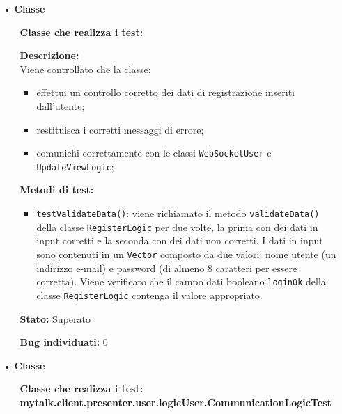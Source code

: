 {\begin{sloppypar}
{{			%
			\begin{itemize}
			\item[•]\textbf{Classe }
				\begin{itemize}
					\item[] \textbf{Classe che realizza i test:}\\

					\item[] \textbf{Descrizione:}\\
					Viene controllato che la classe:
					\begin{itemize}
						\item effettui un controllo corretto dei dati di registrazione inseriti dall’utente;
						\item restituisca i corretti messaggi di errore;
						\item comunichi correttamente con le classi \texttt{WebSocketUser} e \texttt{UpdateViewLogic};
					\end{itemize}									

					\item[] \textbf{Metodi di test:}{
					\begin{itemize}
						\item \texttt{testValidateData()}: viene richiamato il metodo \texttt{validateData()} della classe \texttt{RegisterLogic} per due volte, la prima con dei dati in input corretti e la seconda con dei dati non corretti. I dati in input sono contenuti in un \texttt{Vector} composto da due valori: nome utente (un indirizzo e-mail) e password (di almeno 8 caratteri per essere corretta). Viene verificato che il campo dati booleano \texttt{loginOk} della classe \texttt{RegisterLogic} contenga il valore appropriato.
					\end{itemize}
					}

					\item[] \textbf{Stato:} Superato 

					\item[] \textbf{Bug individuati:} 0
				\end{itemize}			
			\end{itemize}
			}
			
			\begin{itemize}
				\item[•]\textbf{Classe }
				\begin{itemize}
					\item[] \textbf{Classe che realizza i test:\\mytalk.client.presenter.user.logicUser.CommunicationLogicTest}
					

\end{itemize}
\end{itemize}}
\end{sloppypar}}
